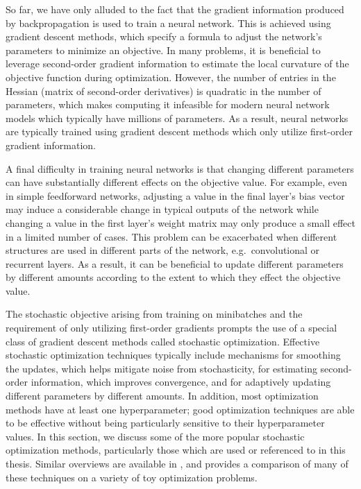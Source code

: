 So far, we have only alluded to the fact that the gradient information produced by backpropagation is used to train a neural network.
This is achieved using gradient descent methods, which specify a formula to adjust the network's parameters to minimize an objective.
In many problems, it is beneficial to leverage second-order gradient information to estimate the local curvature of the objective function during optimization.
However, the number of entries in the Hessian (matrix of second-order derivatives) is quadratic in the number of parameters, which makes computing it infeasible for modern neural network models which typically have millions of parameters.
As a result, neural networks are typically trained using gradient descent methods which only utilize first-order gradient information.

A final difficulty in training neural networks is that changing different parameters can have substantially different effects on the objective value.
For example, even in simple feedforward networks, adjusting a value in the final layer's bias vector may induce a considerable change in typical outputs of the network while changing a value in the first layer's weight matrix may only produce a small effect in a limited number of cases.
This problem can be exacerbated when different structures are used in different parts of the network, e.g.\ convolutional or recurrent layers.
As a result, it can be beneficial to update different parameters by different amounts according to the extent to which they effect the objective value.

The stochastic objective arising from training on minibatches and the requirement of only utilizing first-order gradients prompts the use of a special class of gradient descent methods called stochastic optimization.
Effective stochastic optimization techniques typically include mechanisms for smoothing the updates, which helps mitigate noise from stochasticity, for estimating second-order information, which improves convergence, and for adaptively updating different parameters by different amounts.
In addition, most optimization methods have at least one hyperparameter; good optimization techniques are able to be effective without being particularly sensitive to their hyperparameter values.
In this section, we discuss some of the more popular stochastic optimization methods, particularly those which are used or referenced to in this thesis.
Similar overviews are available in \cite{}, and \cite{} provides a comparison of many of these techniques on a variety of toy optimization problems.

